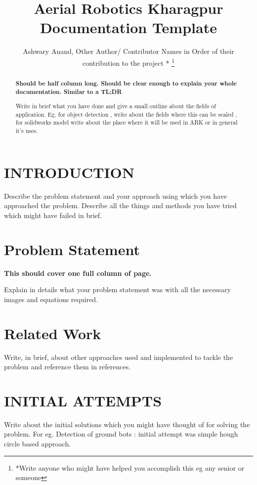 \documentclass[letterpaper, 10 pt, conference]{ieeeconf}
\title{\LARGE \bf
Aerial Robotics Kharagpur Documentation Template
}
\author{Ashwary Anand, Other Author/ Contributor Names in Order of their contribution to the project * 
\thanks{*Write anyone who might have helped you accomplish this eg any senior or someone }
}
\begin{document}
\maketitle 
\thispagestyle{empty}
\pagestyle{empty}


\begin{abstract}
\textbf{Should be half column long. Should be clear enough to explain your whole documentation. Similar to a TL;DR}


Write in brief what you have done and give a small outline about the fields of application. Eg. for object detection , write about the fields where this can be scaled , for solidworks model write about the place where it will be used in ARK or in general it's uses.

\end{abstract}




\section{INTRODUCTION}

Describe the problem statement and your approach using which you have approached the problem. Describe all the things and methods you have tried which might have failed in brief. 

\section{Problem Statement}
\textbf{This should cover one full column of page. }

Explain in details what your problem statement was with all the necessary images and equations required.

\section{Related Work}

Write, in brief, about other approaches used and implemented to tackle the problem and reference them in references.

\section{INITIAL ATTEMPTS}

Write about the initial solutions which you might have thought of for solving the problem.
For eg. Detection of ground bots : initial attempt was simple hough circle based approach. 
\end{document}
